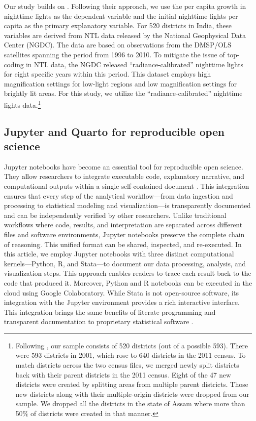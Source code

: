 \documentclass[
  a4paper, 
  twoside,
  review
]{article}
\newcounter{code}
\begin{document}
Our study builds on \citet{chanda_kabiraj_district_convergence}.
Following their approach, we use the per capita growth in nighttime
lights as the dependent variable and the initial nighttime lights per
capita as the primary explanatory variable. For 520 districts in India,
these variables are derived from NTL data released by the National
Geophysical Data Center (NGDC). The data are based on observations from
the DMSP/OLS satellites spanning the period from 1996 to 2010. To
mitigate the issue of top-coding in NTL data, the NGDC released
``radiance-calibrated'' nighttime lights for eight specific years within
this period. This dataset employs high magnification settings for
low-light regions and low magnification settings for brightly lit areas.
For this study, we utilize the ``radiance-calibrated'' nighttime lights
data.\footnote{Following \citet{chanda_kabiraj_district_convergence},
  our sample consists of 520 districts (out of a possible 593). There
  were 593 districts in 2001, which rose to 640 districts in the 2011
  census. To match districts across the two census files, we merged
  newly split districts back with their parent districts in the 2011
  census. Eight of the 47 new districts were created by splitting areas
  from multiple parent districts. Those new districts along with their
  multiple-origin districts were dropped from our sample. We dropped all
  the districts in the state of Assam where more than 50\% of districts
  were created in that manner.}

\subsection{Jupyter and Quarto for reproducible open
science}\label{jupyter-and-quarto-for-reproducible-open-science}

Jupyter notebooks have become an essential tool for reproducible open
science. They allow researchers to integrate executable code,
explanatory narrative, and computational outputs within a single
self-contained document \citep{kluyver_jupyter}. This integration
ensures that every step of the analytical workflow---from data ingestion
and processing to statistical modeling and visualization---is
transparently documented and can be independently verified by other
researchers. Unlike traditional workflows where code, results, and
interpretation are separated across different files and software
environments, Jupyter notebooks preserve the complete chain of
reasoning. This unified format can be shared, inspected, and
re-executed. In this article, we employ Jupyter notebooks with three
distinct computational kernels---Python, R, and Stata---to document our
data processing, analysis, and visualization steps. This approach
enables readers to trace each result back to the code that produced it.
Moreover, Python and R notebooks can be executed in the cloud using
Google Colaboratory. While Stata is not open-source software, its
integration with the Jupyter environment provides a rich interactive
interface. This integration brings the same benefits of literate
programming and transparent documentation to proprietary statistical
software \citep{knuth_literate}.
\end{document}
